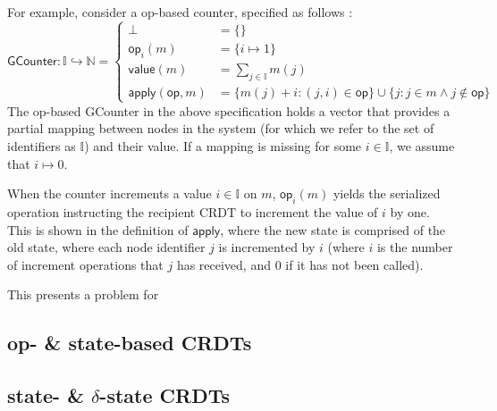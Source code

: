 For example, consider a op-based counter, specified as follows :
\[
\mathsf{GCounter}
  : \mathbb{I} \hookrightarrow \mathbb{N}
  = \left\{
      \begin{aligned}
        \bot &= \{\} \\
        \mathsf{op}_i(m) &= \{ i \mapsto 1 \} \\
        \mathsf{value}(m) &= \sum_{j \in \mathbb{I}} m(j) \\
        \mathsf{apply}(\mathsf{op}, m) &= \{
          m(j) + i : (j, i) \in \mathsf{op}
        \} \cup \{ j : j \in m \land j \notin \mathsf{op} \}
      \end{aligned}
    \right.
\]
The op-based GCounter in the above specification holds a vector that provides a
partial mapping between nodes in the system (for which we refer to the set of
identifiers as $\mathbb{I}$) and their value. If a mapping is missing for some
$i \in \mathbb{I}$, we assume that $i \mapsto 0$.

When the counter increments a value $i \in \mathbb{I}$ on $m$,
$\mathsf{op}_i(m)$ yields the serialized operation instructing the recipient
CRDT to increment the value of $i$ by one. This is shown in the definition of
$\mathsf{apply}$, where the new state is comprised of the old state, where each
node identifier $j$ is incremented by $i$ (where $i$ is the number of increment
operations that $j$ has received, and $0$ if it has not been called).

This presents a problem for

\subsection{op- \& state-based CRDTs}
\subsection{state- \& $\delta$-state CRDTs}
